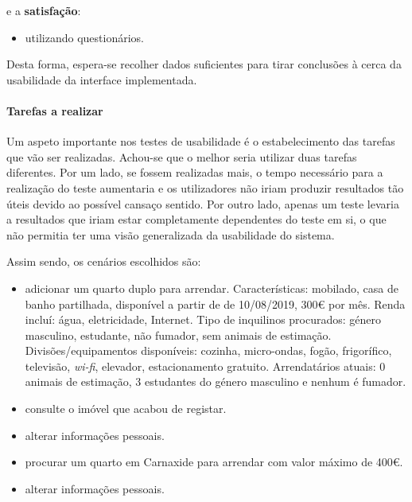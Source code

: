 

e a \textbf{satisfação}:

\begin{itemize}
\item utilizando questionários.
\end{itemize}

Desta forma, espera-se recolher dados suficientes para tirar conclusões à
cerca da usabilidade da interface implementada.

\paragraph{Tarefas a realizar}
\label{sec:orgea1fb37}
Um aspeto importante nos testes de usabilidade é o estabelecimento das
tarefas que vão ser realizadas. Achou-se que o melhor seria utilizar duas
tarefas diferentes. Por um lado, se fossem realizadas mais, o tempo
necessário para a realização do teste aumentaria e os utilizadores não iriam
produzir resultados tão úteis devido ao possível cansaço sentido. Por outro
lado, apenas um teste levaria a resultados que iriam estar completamente
dependentes do teste em si, o que não permitia ter uma visão generalizada da
usabilidade do sistema.

Assim sendo, os cenários escolhidos são:

\begin{itemize}
\item adicionar um quarto duplo para arrendar. Características: mobilado, casa
de banho partilhada, disponível a partir de  de 10/08/2019, 300€ por mês.
Renda incluí: água, eletricidade, Internet. Tipo de inquilinos procurados:
género masculino, estudante, não fumador, sem animais de estimação.
Divisões/equipamentos disponíveis: cozinha, micro-ondas, fogão,
frigorífico, televisão, \textit{wi-fi}, elevador, estacionamento gratuito.
Arrendatários atuais: 0 animais de estimação, 3 estudantes do género
masculino e nenhum é fumador.
\item consulte o imóvel que acabou de registar.
\item alterar informações pessoais.
\item procurar um quarto em Carnaxide para arrendar com valor máximo de 400€.
\item alterar informações pessoais.
\end{itemize}

